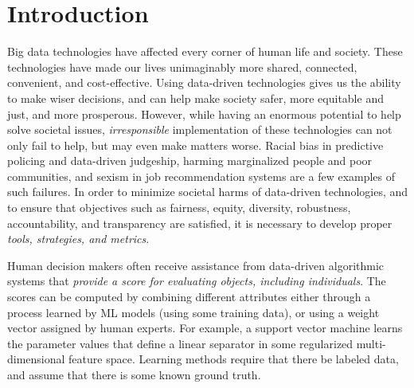 \section{Introduction}
\vspace{-3mm}
Big data technologies have affected every corner of human life and society. These technologies have made our lives unimaginably more shared,  connected,  convenient,  and cost-effective. Using data-driven technologies gives us the ability to make wiser decisions, and can help make society safer, more equitable and just, and more prosperous.
However, while having an enormous potential to help solve societal issues, 
{\em irresponsible} implementation of these technologies  can not only fail to help, but may even make matters worse.  
Racial bias in predictive policing and data-driven judgeship, harming marginalized people and poor communities, and sexism in job recommendation systems are a few examples of such failures. In order to minimize societal harms of data-driven technologies, and to ensure that objectives such as fairness, equity, diversity, robustness, accountability, and transparency are satisfied, it is necessary to
develop proper {\em tools, strategies, and metrics}. 

Human decision makers often receive assistance from data-driven algorithmic systems that {\em provide a score for evaluating objects, including individuals}.
The scores can be computed by combining different attributes either through a process learned by ML models (using some training data),  or using a weight vector assigned by human experts.  For example, a support vector machine learns the parameter values that define a linear separator in some regularized multi-dimensional feature space.  Learning methods require that there be labeled data, and assume that there is some known ground truth. 


